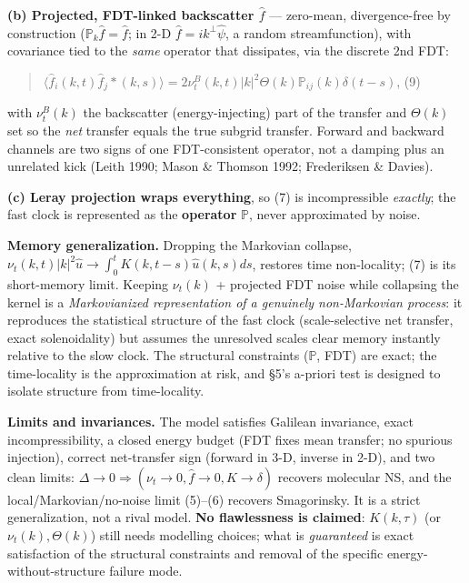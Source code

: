 \documentclass[aps,prfluids,preprint,superscriptaddress,nofootinbib]{revtex4-2}
\begin{document}
\textbf{(b) Projected, FDT-linked backscatter $\hat{f}$} — zero-mean, divergence-free by construction ($\mathbb{P}_{k} \hat{f}=\hat{f}$; in 2-D $\hat{f}=ik^\perp \hat{\psi }$, a random streamfunction), with covariance tied to the \emph{same} operator that dissipates, via the discrete 2nd FDT:

\begin{quote}
$\langle \hat{f}_{i}(k,t)\hat{f}_{j}*(k,s)\rangle  = 2 \nu _{t}^{B}(k,t)|k|^{2} \Theta (k) \mathbb{P}_{ij}(k) \delta (t-s)$, (9)
\end{quote}

with $\nu _{t}^{B}(k)$ the backscatter (energy-injecting) part of the transfer and $\Theta (k)$ set so the \emph{net} transfer equals the true subgrid transfer. Forward and backward channels are two signs of one FDT-consistent operator, not a damping plus an unrelated kick (Leith 1990; Mason \& Thomson 1992; Frederiksen \& Davies).

\textbf{(c) Leray projection wraps everything}, so (7) is incompressible \emph{exactly}; the fast clock is represented as the \textbf{operator} $\mathbb{P}$, never approximated by noise.

\textbf{Memory generalization.} Dropping the Markovian collapse, $\nu _{t}(k,t)|k|^{2}\hat{u} \longrightarrow  \int _{0}^{t} K(k,t-s)\hat{u}(k,s)ds$, restores time non-locality; (7) is its short-memory limit. Keeping $\nu _{t}(k)$ + projected FDT noise while collapsing the kernel is a \emph{Markovianized representation of a genuinely non-Markovian process}: it reproduces the statistical structure of the fast clock (scale-selective net transfer, exact solenoidality) but assumes the unresolved scales clear memory instantly relative to the slow clock. The structural constraints ($\mathbb{P}$, FDT) are exact; the time-locality is the approximation at risk, and §5's a-priori test is designed to isolate structure from time-locality.

\textbf{Limits and invariances.} The model satisfies Galilean invariance, exact incompressibility, a closed energy budget (FDT fixes mean transfer; no spurious injection), correct net-transfer sign (forward in 3-D, inverse in 2-D), and two clean limits: $\Delta \to 0 \Rightarrow  (\nu _{t}\to 0, \hat{f}\to 0, K\to \delta )$ recovers molecular NS, and the local/Markovian/no-noise limit (5)–(6) recovers Smagorinsky. It is a strict generalization, not a rival model. \textbf{No flawlessness is claimed}: $K(k,\tau )$ (or $\nu _{t}(k), \Theta (k)$) still needs modelling choices; what is \emph{guaranteed} is exact satisfaction of the structural constraints and removal of the specific energy-without-structure failure mode.
\end{document}
